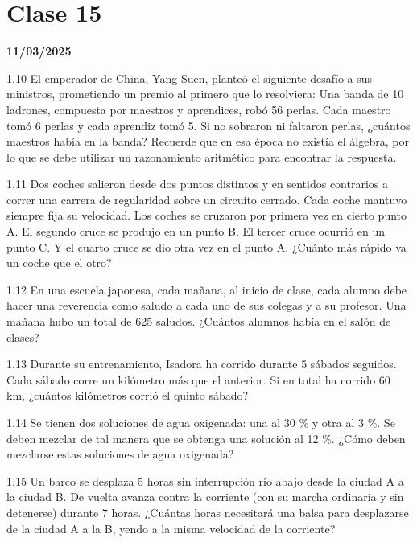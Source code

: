\section{Clase 15}
\textbf{11/03/2025}

1.10 El emperador de China, Yang Suen, planteó el siguiente desafío a sus ministros, prometiendo un premio al primero que lo resolviera: Una banda de 10 ladrones, compuesta por maestros y aprendices, robó 56 perlas. Cada maestro tomó 6 perlas y cada aprendiz tomó 5. Si no sobraron ni faltaron perlas, ¿cuántos maestros había en la banda? Recuerde que en esa época no existía el álgebra, por lo que se debe utilizar un razonamiento aritmético para encontrar la respuesta.

1.11 Dos coches salieron desde dos puntos distintos y en sentidos contrarios a correr una carrera de regularidad sobre un circuito cerrado. Cada coche mantuvo siempre fija su velocidad. Los coches se cruzaron por primera vez en cierto punto A. El segundo cruce se produjo en un punto B. El tercer cruce ocurrió en un punto C. Y el cuarto cruce se dio otra vez en el punto A. ¿Cuánto más rápido va un coche que el otro?

1.12 En una escuela japonesa, cada mañana, al inicio de clase, cada alumno debe hacer una reverencia como saludo a cada uno de sus colegas y a su profesor. Una mañana hubo un total de 625 saludos. ¿Cuántos alumnos había en el salón de clases?

1.13 Durante su entrenamiento, Isadora ha corrido durante 5 sábados seguidos. Cada sábado corre un kilómetro más que el anterior. Si en total ha corrido 60 km, ¿cuántos kilómetros corrió el quinto sábado?

1.14 Se tienen dos soluciones de agua oxigenada: una al 30 \% y otra al 3 \%. Se deben mezclar de tal manera que se obtenga una solución al 12 \%. ¿Cómo deben mezclarse estas soluciones de agua oxigenada?

1.15 Un barco se desplaza 5 horas sin interrupción río abajo desde la ciudad A a la ciudad B. De vuelta avanza contra la corriente (con su marcha ordinaria y sin detenerse) durante 7 horas. ¿Cuántas horas necesitará una balsa para desplazarse de la ciudad A a la B, yendo a la misma velocidad de la corriente?